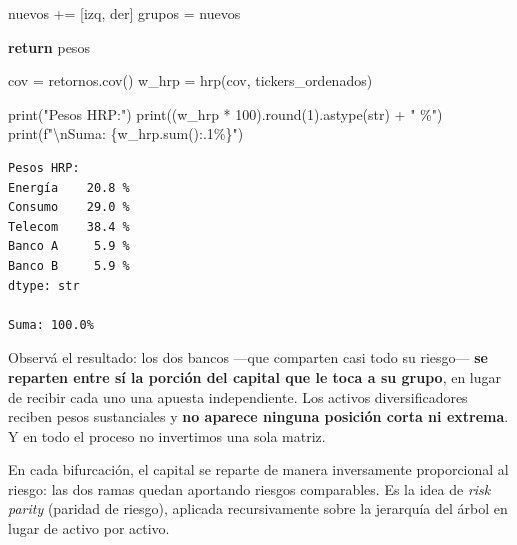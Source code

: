 \documentclass[
  spanish,
  letterpaper,
  DIV=11,
  numbers=noendperiod]{scrreprt}
\newenvironment{Shaded}{\begin{snugshade}}{\end{snugshade}}
\newcommand{\BuiltInTok}[1]{\textcolor[rgb]{0.00,0.23,0.31}{#1}}
\newcommand{\CharTok}[1]{\textcolor[rgb]{0.13,0.47,0.30}{#1}}
\newcommand{\ControlFlowTok}[1]{\textcolor[rgb]{0.00,0.23,0.31}{\textbf{#1}}}
\newcommand{\DecValTok}[1]{\textcolor[rgb]{0.68,0.00,0.00}{#1}}
\newcommand{\NormalTok}[1]{\textcolor[rgb]{0.00,0.23,0.31}{#1}}
\newcommand{\OperatorTok}[1]{\textcolor[rgb]{0.37,0.37,0.37}{#1}}
\newcommand{\SpecialCharTok}[1]{\textcolor[rgb]{0.37,0.37,0.37}{#1}}
\newcommand{\SpecialStringTok}[1]{\textcolor[rgb]{0.13,0.47,0.30}{#1}}
\newcommand{\StringTok}[1]{\textcolor[rgb]{0.13,0.47,0.30}{#1}}
\begin{document}
\begin{Shaded}
\begin{Highlighting}[]
\NormalTok{            nuevos }\OperatorTok{+=}\NormalTok{ [izq, der]}
\NormalTok{        grupos }\OperatorTok{=}\NormalTok{ nuevos}

    \ControlFlowTok{return}\NormalTok{ pesos}

\NormalTok{cov }\OperatorTok{=}\NormalTok{ retornos.cov()}
\NormalTok{w\_hrp }\OperatorTok{=}\NormalTok{ hrp(cov, tickers\_ordenados)}

\BuiltInTok{print}\NormalTok{(}\StringTok{"Pesos HRP:"}\NormalTok{)}
\BuiltInTok{print}\NormalTok{((w\_hrp }\OperatorTok{*} \DecValTok{100}\NormalTok{).}\BuiltInTok{round}\NormalTok{(}\DecValTok{1}\NormalTok{).astype(}\BuiltInTok{str}\NormalTok{) }\OperatorTok{+} \StringTok{" \%"}\NormalTok{)}
\BuiltInTok{print}\NormalTok{(}\SpecialStringTok{f"}\CharTok{\textbackslash{}n}\SpecialStringTok{Suma: }\SpecialCharTok{\{}\NormalTok{w\_hrp}\SpecialCharTok{.}\BuiltInTok{sum}\NormalTok{()}\SpecialCharTok{:.1\%\}}\SpecialStringTok{"}\NormalTok{)}
\end{Highlighting}
\end{Shaded}

\begin{verbatim}
Pesos HRP:
Energía    20.8 %
Consumo    29.0 %
Telecom    38.4 %
Banco A     5.9 %
Banco B     5.9 %
dtype: str

Suma: 100.0%
\end{verbatim}

Observá el resultado: los dos bancos ---que comparten casi todo su
riesgo--- \textbf{se reparten entre sí la porción del capital que le
toca a su grupo}, en lugar de recibir cada uno una apuesta
independiente. Los activos diversificadores reciben pesos sustanciales y
\textbf{no aparece ninguna posición corta ni extrema}. Y en todo el
proceso no invertimos una sola matriz.

\begin{tcolorbox}[enhanced jigsaw, bottomrule=.15mm, colback=white, opacitybacktitle=0.6, arc=.35mm, toprule=.15mm, opacityback=0, breakable, titlerule=0mm, left=2mm, coltitle=black, colbacktitle=quarto-callout-tip-color!10!white, colframe=quarto-callout-tip-color-frame, leftrule=.75mm, toptitle=1mm, bottomtitle=1mm, title=\textcolor{quarto-callout-tip-color}{\faLightbulb}\hspace{0.5em}{Por qué esto es `risk parity' jerárquico}, rightrule=.15mm]

En cada bifurcación, el capital se reparte de manera inversamente
proporcional al riesgo: las dos ramas quedan aportando riesgos
comparables. Es la idea de \emph{risk parity} (paridad de riesgo),
aplicada recursivamente sobre la jerarquía del árbol en lugar de activo
por activo.

\end{tcolorbox}
\end{document}

